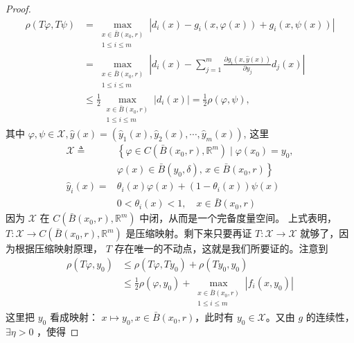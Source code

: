 \documentclass[lang=cn,newtx,10pt,scheme=chinese,thmcnt=chapter]{elegantbook}
\begin{document}
\begin{proof}
\begin{equation*}
\begin{aligned}
\rho(T \varphi, T \psi) & = \max_{\substack{x \in \bar{B}(x_0, r) \\ 1 \leqslant i \leqslant m}} \left|d_i(x) - g_i(x, \varphi(x)) + g_i(x, \psi(x))\right| \\
& = \max_{\substack{x \in \bar{B}(x_0, r) \\ 1 \leqslant i \leqslant m}} \left|d_i(x) - \sum_{j=1}^m \frac{\partial g_i(x, \widehat{y}(x))}{\partial y_j} d_j(x)\right|\\
&\leqslant \frac{1}{2} \max _{\substack{x \in \bar{B}\left(x_0, r\right) \\ 1 \leqslant i \leqslant m}}\left|d_i(x)\right|=\frac{1}{2} \rho(\varphi, \psi),
\end{aligned}
\end{equation*}
其中 \( \varphi, \psi \in \mathscr{X}, \widehat{y}(x) = (\widehat{y}_1(x), \widehat{y}_2(x), \cdots, \widehat{y}_m(x)) \), 这里
\begin{equation*}
\begin{aligned}
\mathscr{X} \triangleq & \left\{ \varphi \in C\left(\bar{B}(x_0, r), \mathbb{R}^m\right) \mid \varphi(x_0) = y_0, \right. \\
& \left. \varphi(x) \in \bar{B}(y_0, \delta), \, x \in \bar{B}(x_0, r) \right\} \\
\widehat{y}_i(x) = & \theta_i(x) \varphi(x) + (1 - \theta_i(x)) \psi(x) \\
& 0 < \theta_i(x) < 1, \quad x \in \bar{B}(x_0, r)
\end{aligned}
\end{equation*}
因为 \( \mathscr{X} \) 在 \( C\left(\bar{B}(x_0, r), \mathbb{R}^m\right) \) 中闭，从而是一个完备度量空间。 上式表明， \( T: \mathscr{X} \rightarrow C\left(\bar{B}(x_0, r), \mathbb{R}^m\right) \) 是压缩映射。剩下来只要再证 \( T: \mathscr{X} \rightarrow \mathscr{X} \) 就够了，因为根据压缩映射原理， \( T \) 存在唯一的不动点，这就是我们所要证的。注意到
\begin{equation*}
\begin{aligned}
\rho(T \varphi, y_0) & \leqslant \rho(T \varphi, T y_0) + \rho(T y_0, y_0) \\
& \leqslant \frac{1}{2} \rho(\varphi, y_0) + \max_{\substack{x \in \bar{B}(x_0, r) \\ 1 \leqslant i \leqslant m}} \left|f_i(x, y_0)\right|
\end{aligned}
\end{equation*}
这里把 \( y_0 \) 看成映射： \( x \mapsto y_0, x \in \bar{B}(x_0, r) \)，此时有 \( y_0 \in \mathscr{X} \)。又由 \( g \) 的连续性， \( \exists \eta > 0 \) ，使得

\end{proof}
\end{document}
